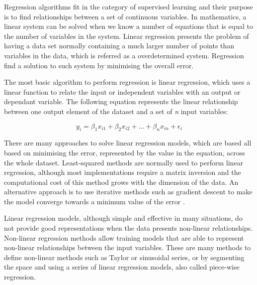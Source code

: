 \medskip

Regression algorithms fit in the category of supervised learning and their purpose is to find relationships between a set of continuous variables. In mathematics, a linear system can be solved when we know a number of equations that is equal to the number of variables in the system. Linear regression presents the problem of having a data set normally containing a much larger number of points than variables in the data, which is referred as a overdetermined system. Regression find a solution to such system by minimising the overall error.

The most basic algorithm to perform regression is linear regression, which uses a linear function to relate the input or independent variables with an output or dependant variable. The following equation represents the linear relationship between one output element of the dataset and a set of \textit{n} input variables:

\[ y_i = \beta_1 x_{i1} + \beta_2 x_{i2} + ... + \beta_n x_{in} + \epsilon_i \]

There are many approaches to solve linear regression models, which are based all based on minimising the error, represented by the \textepsilon value in the equation, across the whole dataset.  Least-squared methods are normally used to perform linear regression, although most implementations require a matrix inversion and the computational cost of this method grows with the dimension of the data. An alternative approach is to use iterative methods such as gradient descent to make the model converge towards a minimum value of the error \textepsilon. 

\medskip

Linear regression models, although simple and effective in many situations, do not provide good representations when the data presents non-linear relationships. Non-linear regression methods allow training models that are able to represent non-linear relationships between the input variables. These are many methods to define non-linear methods such as Taylor or sinusoidal series, or by segmenting the space and using a series of linear regression models, also called piece-wise regression.

\medskip

